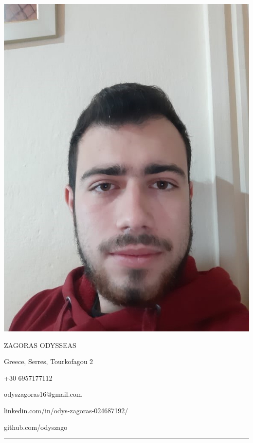 \documentclass[a4paper,10pt]{article}
\newlength{\cvcolumngapwidth}
\newlength{\cvleftcolumnwidth}
\newlength{\cvrightcolumnwidth}
\newcommand{\cvnamestyle}[1]{{\Large\cvnamefont\textcolor{cvnamecolor}{#1}}}
\newcommand{\cvsectionstyle}[1]{{\normalsize\cvsectionfont\textcolor{cvsectioncolor}{#1}}}
\newlength{\cvafteritemskipamount}
\newlength{\cvaftersectionskipamount}
\newlength{\cvafternameskipamount}
\newlength{\cvafterpersonalinfolineskipamount}
\newcommand{\cvpersonalinfo}[2]{
    \begin{minipage}[t]{\cvleftcolumnwidth}
        \vspace{0mm} %
        \raggedleft #1
    \end{minipage}%
    \hspace{\cvcolumngapwidth}%
    \begin{minipage}[t]{\cvrightcolumnwidth}
        \vspace{0mm} %
        #2
    \end{minipage}

    \vspace{\cvafteritemskipamount}
}
\newcommand{\cvname}[1]{
    \cvnamestyle{#1}

    \vspace{\cvafternameskipamount}
}
\newcommand{\cvpersonalinfolinewithicon}[3]{
    \raisebox{.5\fontcharht\font`E-.5\height}{\texttt{[image: \#2]}}
    #3

    \vspace{\cvafterpersonalinfolineskipamount}
}
\newcommand{\cvsection}[1]{
    \begin{minipage}[t]{\cvleftcolumnwidth}
        \raggedleft\cvsectionstyle{#1}
    \end{minipage}%
    \hspace{\cvcolumngapwidth}%
    \begin{minipage}[t]{\cvrightcolumnwidth}
        \textcolor{cvrulecolor}{\rule{\cvrightcolumnwidth}{0.3mm}}
    \end{minipage}

    \vspace{\cvaftersectionskipamount}
}
\begin{document}

\cvpersonalinfo{
    \includegraphics[width=.8\linewidth]{cv_icon.png.jpg}
}{
    \cvname{ZAGORAS ODYSSEAS}

    \cvpersonalinfolinewithicon{height=4mm}{072-location.pdf}{
        Greece, Serres, Tourkofagou 2
    }

    \cvpersonalinfolinewithicon{height=4mm}{067-phone.pdf}{
        +30 6957177112
    }

    \cvpersonalinfolinewithicon{height=4mm}{070-envelop.pdf}{
        odyszagoras16@gmail.com    
    }

    \cvpersonalinfolinewithicon{height=4mm}{458-linkedin.pdf}{
       linkedin.com/in/odys-zagoras-024687192/
    }
    \cvpersonalinfolinewithicon{height=4mm}{png2pdf.pdf}{
        github.com/odyszago
    }

}



\cvsection{WORKING EXPERIENCE}
\end{document}

